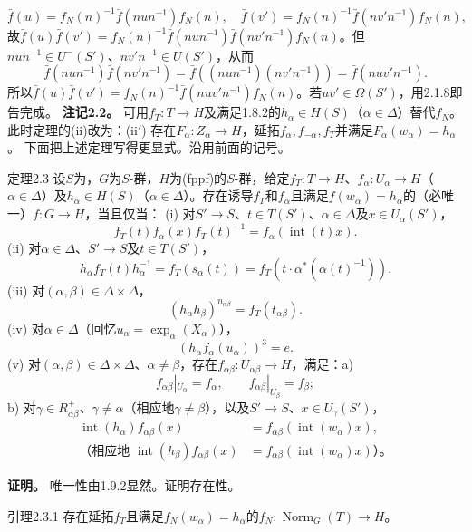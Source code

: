 \[\bar f(u)=f_N(n)^{-1}\bar f(nun^{-1})f_N(n),\quad \bar f(v')=f_N(n)^{-1}\bar f(nv'n^{-1})f_N(n),\]
故$\bar f(u)\bar f(v')=f_N(n)^{-1}\bar f(nun^{-1})\bar f(nv'n^{-1})f_N(n)$。但$nun^{-1}\in U^-(S')$、$nv'n^{-1}\in U(S')$，从而
\[\bar f(nun^{-1})\bar f(nv'n^{-1})=\bar f((nun^{-1})(nv'n^{-1}))=\bar f(nuv'n^{-1}).\]
所以$\bar f(u)\bar f(v')=f_N(n)^{-1}\bar f(nuv'n^{-1})f_N(n)$。若$uv'\in\Omega(S')$，用2.1.8即告完成。
\textbf{注记2.2。} 可用$f_T:T\to H$及满足1.8.2的$h_\alpha\in H(S)$（$\alpha\in\Delta$）替代$f_N$。此时定理的(ii)改为：(ii$'$) 存在$F_\alpha:Z_\alpha\to H$，延拓$f_\alpha,f_{-\alpha},f_T$并满足$F_\alpha(w_\alpha)=h_\alpha$。
下面把上述定理写得更显式。沿用前面的记号。
\begin{SGAresult}{定理}{2.3}
设$S$为，$G$为$S$-群，$H$为(fppf)的$S$-群，给定$f_T:T\to H$、$f_\alpha:U_\alpha\to H$（$\alpha\in\Delta$）及$h_\alpha\in H(S)$（$\alpha\in\Delta$）。存在诱导$f_T$和$f_\alpha$且满足$f(w_\alpha)=h_\alpha$的（必唯一）$f:G\to H$，当且仅当：
(i) 对$S'\to S$、$t\in T(S')$、$\alpha\in\Delta$及$x\in U_\alpha(S')$，
\[f_T(t)f_\alpha(x)f_T(t)^{-1}=f_\alpha(\operatorname{int}(t)x).\tag{1}\]
(ii) 对$\alpha\in\Delta$、$S'\to S$及$t\in T(S')$，
\[h_\alpha f_T(t)h_\alpha^{-1}=f_T(s_\alpha(t))=f_T(t\cdot\alpha^*(\alpha(t)^{-1})).\tag{2}\]
(iii) 对$(\alpha,\beta)\in\Delta\times\Delta$，
\[(h_\alpha h_\beta)^{n_{\alpha\beta}}=f_T(t_{\alpha\beta}).\tag{3}\]
(iv) 对$\alpha\in\Delta$（回忆$u_\alpha=\exp_\alpha(X_\alpha)$），
\[(h_\alpha f_\alpha(u_\alpha))^3=e.\tag{4}\]
(v) 对$(\alpha,\beta)\in\Delta\times\Delta$、$\alpha\ne\beta$，存在$f_{\alpha\beta}:U_{\alpha\beta}\to H$，满足：a)
\[f_{\alpha\beta}|_{U_\alpha}=f_\alpha,\qquad f_{\alpha\beta}|_{U_\beta}=f_\beta;\tag{5}\]
b) 对$\gamma\in R^+_{\alpha\beta}$、$\gamma\ne\alpha$（相应地$\gamma\ne\beta$），以及$S'\to S$、$x\in U_\gamma(S')$，
\[\begin{aligned}\operatorname{int}(h_\alpha)f_{\alpha\beta}(x)&=f_{\alpha\beta}(\operatorname{int}(w_\alpha)x),\\
\text{（相应地 }\operatorname{int}(h_\beta)f_{\alpha\beta}(x)&=f_{\alpha\beta}(\operatorname{int}(w_\alpha)x)\text{）。}\end{aligned}\tag{6}\]
\end{SGAresult}
\textbf{证明。} 唯一性由1.9.2显然。证明存在性。
\begin{SGAresult}{引理}{2.3.1}
存在延拓$f_T$且满足$f_N(w_\alpha)=h_\alpha$的$f_N:\operatorname{Norm}_G(T)\to H$。
\end{SGAresult}

